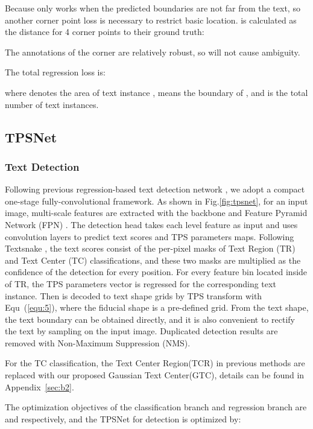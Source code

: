 \documentclass[sigconf]{acmart}
\begin{document}
	Because  only works when the predicted boundaries are not far from the text, so another corner point loss  is necessary to restrict basic location.  is calculated as the distance for 4 corner points to their ground truth:
	
	The annotations of the corner are relatively robust, so  will not cause ambiguity.
	
	The total regression loss is:
	
	where  denotes the area of text instance ,  means the boundary of , and  is the total number of text instances.
	
	
	\subsection{TPSNet}
	\subsubsection{Text Detection}  
	Following previous regression-based text detection network    \cite{zhou2017east, Wang2020textray, zhu2021fourier}, we adopt a compact one-stage fully-convolutional framework. As shown in Fig.\ref{fig:tpsnet}, for an input image, multi-scale features are extracted with the backbone and Feature Pyramid Network (FPN) \cite{lin2017FPN}. The detection head takes each level feature as input and uses convolution layers to predict text scores and TPS parameters maps. Following Textsnake \cite{long2018textsnake}, the text scores consist of the per-pixel masks of Text Region (TR) and Text Center (TC) classifications, and these two masks are multiplied as the confidence of the detection for every position. For every feature bin located inside of TR, the TPS parameters vector  is regressed for the corresponding text instance. Then  is decoded to text shape grids by TPS transform with Equ~(\ref{equ:5}), where the fiducial shape is a pre-defined grid. From the text shape, the text boundary can be obtained directly, and it is also convenient to rectify the text by sampling on the input image. Duplicated detection results are removed with Non-Maximum Suppression (NMS).
	
	For the TC classification, the Text Center Region(TCR) in previous methods are replaced with our proposed Gaussian Text Center(GTC), details can be found in Appendix~\ref{sec:b2}.
	
	The optimization objectives of the classification branch and regression branch are  and  respectively, and the TPSNet for detection is optimized by:
	
\end{document}
